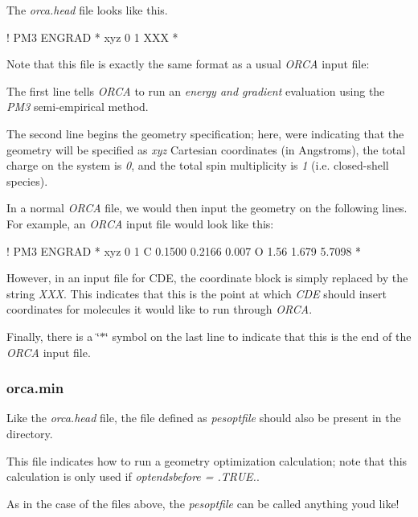 The {\itshape orca.\+head} file looks like this. \begin{DoxyVerb}! PM3 ENGRAD
* xyz 0 1
XXX
*
\end{DoxyVerb}


Note that this file is exactly the same format as a usual {\itshape O\+R\+CA} input file\+:


\begin{DoxyItemize}
\item The first line tells {\itshape O\+R\+CA} to run an {\itshape energy and gradient} evaluation using the {\itshape P\+M3} semi-\/empirical method.
\item The second line begins the geometry specification; here, we\textquotesingle{}re indicating that the geometry will be specified as {\itshape xyz} Cartesian coordinates (in Angstroms), the total charge on the system is {\itshape 0}, and the total spin multiplicity is {\itshape 1} (i.\+e. closed-\/shell species).
\item In a normal {\itshape O\+R\+CA} file, we would then input the geometry on the following lines. For example, an {\itshape O\+R\+CA} input file would look like this\+: \begin{DoxyVerb}  ! PM3 ENGRAD
  * xyz 0 1
  C 0.1500  0.2166 0.007
  O 1.56  1.679  5.7098
  *
\end{DoxyVerb}

\item However, in an input file for C\+DE, the coordinate block is simply replaced by the string {\itshape X\+XX}. This indicates that this is the point at which {\itshape C\+DE} should insert coordinates for molecules it would like to run through {\itshape O\+R\+CA}.
\item Finally, there is a \char`\"{}$\ast$\char`\"{} symbol on the last line to indicate that this is the end of the {\itshape O\+R\+CA} input file.
\end{DoxyItemize}

\subsubsection*{orca.\+min}

Like the {\itshape orca.\+head} file, the file defined as {\itshape pesoptfile} should also be present in the directory.

This file indicates how to run a geometry optimization calculation; note that this calculation is only used if {\itshape optendsbefore = .T\+R\+UE.}.

As in the case of the files above, the {\itshape pesoptfile} can be called anything you\textquotesingle{}d like!

